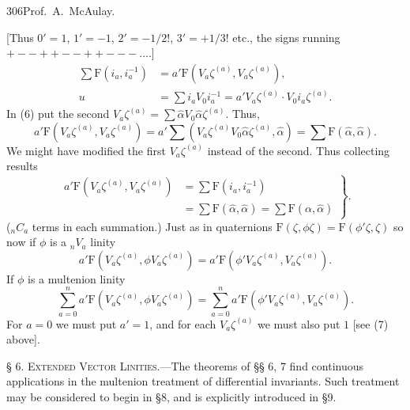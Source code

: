 \documentclass[11pt]{article}
\begin{document}
\newpage\thispagestyle{empty}\begin{center}306\hfill Prof.\ A.\ McAulay.\end{center}
[Thus $0'=1$, $1'=-1$, $2'=-1/2!$, $3'=+1/3!$ etc., the signs running $+--++--++---\ldots$.]
\begin{align}\sum\mathrm F(i_a,i_a^{-1})&=a'\mathrm F(V_a\zeta^{(a)},V_a\zeta^{(a)}),\tag{6}\\u&=\sum i_aV_0i_a^{-1}=a'V_a\zeta^{(a)}\cdot V_0i_a\zeta^{(a)}.\tag{7}\end{align}
In (6) put the second $V_a\zeta^{(a)}=\sum\hat\alpha V_0\hat\alpha\zeta^{(a)}$. Thus,
\[a'\mathrm F(V_a\zeta^{(a)},V_a\zeta^{(a)})=a'\sum(V_a\zeta^{(a)}V_0\hat\alpha\zeta^{(a)},\hat\alpha)=\sum\mathrm F(\hat\alpha,\hat\alpha).\]
We might have modified the first $V_a\zeta^{(a)}$ instead of the second. Thus collecting results
\begin{equation}\left.\begin{aligned}a'\mathrm F(V_a\zeta^{(a)},V_a\zeta^{(a)})&=\sum\mathrm F(i_a,i_a^{-1})\\&=\sum\mathrm F(\hat\alpha,\hat\alpha)=\sum\mathrm F(\alpha,\hat\alpha)\end{aligned}\right\}.\tag{8}\end{equation}
(${}_nC_a$ terms in each summation.) Just as in quaternions $\mathrm F(\zeta,\phi\zeta)=\mathrm F(\phi'\zeta,\zeta)$ so now if $\phi$ is a ${}_nV_a$ linity
\begin{equation}a'\mathrm F(V_a\zeta^{(a)},\phi V_a\zeta^{(a)})=a'\mathrm F(\phi'V_a\zeta^{(a)},V_a\zeta^{(a)}).\tag{9}\end{equation}
If $\phi$ is a multenion linity
\begin{equation}\sum_{a=0}^na'\mathrm F(V_a\zeta^{(a)},\phi V_a\zeta^{(a)})=\sum_{a=0}^na'\mathrm F(\phi'V_a\zeta^{(a)},V_a\zeta^{(a)}).\tag{10}\end{equation}
For $a=0$ we must put $a'=1$, and for each $V_a\zeta^{(a)}$ we must also put $1$ [see (7) above].

\noindent\textsc{§ 6. Extended Vector Linities.}---The theorems of §§ 6, 7 find continuous applications in the multenion treatment of differential invariants. Such treatment may be considered to begin in §8, and is explicitly introduced in §9.
\end{document}
